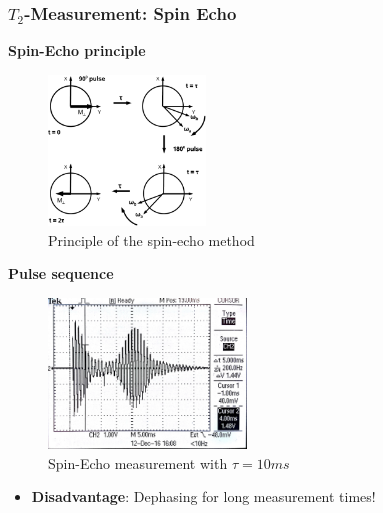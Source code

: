 \documentclass[aspectratio=169]{beamer}
\begin{document}
\begin{frame}
	\frametitle{$T_2$-Measurement: Spin Echo}
	\begin{minipage}[t]{0.45\textwidth}
		\centering
		\textbf{Spin-Echo principle}
		\begin{figure}
			\includegraphics[height=40mm]{./Resources/spin_ech_schematic.png}
			\caption{Principle of the spin-echo method}
			\label{fig:spinecho_bloch}
		\end{figure}
	\end{minipage}
	\hfill
	\pause
	\begin{minipage}[t]{0.45\textwidth}
		\centering
		\textbf{Pulse sequence}
		\begin{figure}
			\includegraphics[height=40mm]{./Resources/spinecho_osci.jpg}
			\caption{Spin-Echo measurement with $\tau=10ms$}
			\label{fig:spinecho_osci}
		\end{figure}
	\end{minipage}
	\pause
	\begin{itemize}
		\item \textbf{Disadvantage}: Dephasing for long measurement times!
	\end{itemize}
\end{frame}
\end{document}
